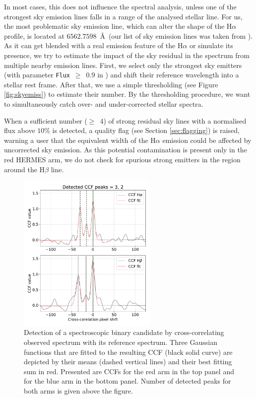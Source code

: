 In most cases, this does not influence the spectral analysis, unless one of the strongest sky emission lines falls in a range of the analysed stellar line. For us, the most problematic sky emission line, which can alter the shape of the H$\alpha$ profile, is located at $6562.7598$~\AA\ (our list of sky emission lines was taken from \citet{2003A&A...407.1157H}). As it can get blended with a real emission feature of the H$\alpha$ or simulate its presence, we try to estimate the impact of the sky residual in the spectrum from multiple nearby emission lines. First, we select only the strongest sky emitters (with parameter \texttt{Flux}~$\ge$~$0.9$ in \citet{2003A&A...407.1157H}) and shift their reference wavelength into a stellar rest frame. After that, we use a simple thresholding (see Figure \ref{fig:skyemiss}) to estimate their number. By the thresholding procedure, we want to simultaneously catch over- and under-corrected stellar spectra.

When a sufficient number ($\ge$~$4$) of strong residual sky lines with a normalised flux above $10$\% is detected, a quality flag (see Section \ref{sec:flagging}) is raised, warning a user that the equivalent width of the H$\alpha$ emission could be affected by uncorrected sky emission. As this potential contamination is present only in the red HERMES arm, we do not check for spurious strong emitters in the region around the H$\beta$ line.

\begin{figure}
	\centering
	\includegraphics[width=0.6\textwidth]{paper_140812003801021_3.pdf}
	\caption{Detection of a spectroscopic binary candidate by cross-correlating observed spectrum with its reference spectrum. Three Gaussian functions that are fitted to the resulting CCF (black solid curve) are depicted by their means (dashed vertical lines) and their best fitting sum in red. Presented are CCFs for the red arm in the top panel and for the blue arm in the bottom panel. Number of detected peaks for both arms is given above the figure.}
	\label{fig:sb2ccf}
\end{figure}

